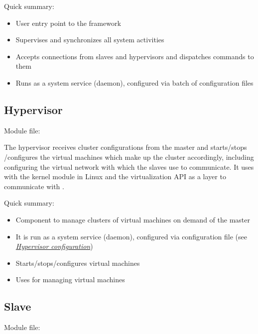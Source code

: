 \documentclass[a4paper,11pt,openany]{sphinxmanual}
\begin{document}
Quick summary:
\begin{itemize}
\item {} 
User entry point to the framework

\item {} 
Supervises and synchronizes all system activities

\item {} 
Accepts connections from slaves and hypervisors and dispatches commands to
them

\item {} 
Runs as a system service (daemon), configured via batch of configuration files

\end{itemize}


\subsection{Hypervisor}
\label{general-overview:hypervisor}\label{general-overview:id2}
Module file: 

The hypervisor receives cluster configurations from the master and starts/stops
/configures the virtual machines which make up the cluster accordingly,
including configuring the virtual network with which the slaves use to
communicate. It uses  with the  kernel module in Linux
and the  virtualization API as a layer to communicate with
.

Quick summary:
\begin{itemize}
\item {} 
Component to manage clusters of virtual machines on demand of the master

\item {} 
It is run as a system service (daemon), configured via configuration file
(see {\hyperref[config-hypervisor::doc]{\emph{Hypervisor configuration}}})

\item {} 
Starts/stops/configures virtual machines

\item {} 
Uses  for managing virtual machines

\end{itemize}


\subsection{Slave}
\label{general-overview:slave}\label{general-overview:id3}
Module file: 
\end{document}
